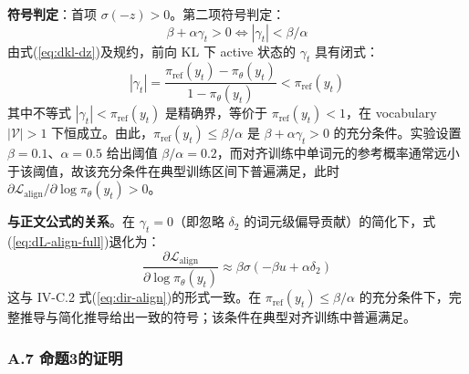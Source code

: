 \documentclass[lettersize,journal]{IEEEtran}
\begin{document}
\textbf{符号判定}：首项 $\sigma(-z) > 0$。第二项符号判定：
\begin{equation}
\beta + \alpha\gamma_t > 0 \iff |\gamma_t| < \beta/\alpha
\end{equation}
由式(\ref{eq:dkl-dz})及规约，前向 KL 下 active 状态的 $\gamma_t$ 具有闭式：
\begin{equation}
|\gamma_t| = \frac{\pi_{\text{ref}}(y_t) - \pi_\theta(y_t)}{1 - \pi_\theta(y_t)} < \pi_{\text{ref}}(y_t)
\end{equation}
其中不等式 $|\gamma_t| < \pi_{\text{ref}}(y_t)$ 是精确界，等价于 $\pi_{\text{ref}}(y_t) < 1$，在 vocabulary $|\mathcal{V}| > 1$ 下恒成立。由此，$\pi_{\text{ref}}(y_t) \leq \beta/\alpha$ 是 $\beta + \alpha\gamma_t > 0$ 的充分条件。实验设置 $\beta=0.1$、$\alpha=0.5$ 给出阈值 $\beta/\alpha = 0.2$，而对齐训练中单词元的参考概率通常远小于该阈值，故该充分条件在典型训练区间下普遍满足，此时 $\partial \mathcal{L}_{\text{align}}/\partial \log\pi_\theta(y_t) > 0$。

\textbf{与正文公式的关系}。在 $\gamma_t = 0$（即忽略 $\delta_2$ 的词元级偏导贡献）的简化下，式(\ref{eq:dL-align-full})退化为：
\begin{equation}
\frac{\partial \mathcal{L}_{\text{align}}}{\partial \log\pi_\theta(y_t)} \approx \beta\sigma(-\beta u + \alpha\delta_2)
\end{equation}
这与 IV-C.2 式(\ref{eq:dir-align})的形式一致。在 $\pi_{\text{ref}}(y_t) \leq \beta/\alpha$ 的充分条件下，完整推导与简化推导给出一致的符号；该条件在典型对齐训练中普遍满足。

\subsubsection*{A.7 命题3的证明}\label{app:conflict}
\end{document}
